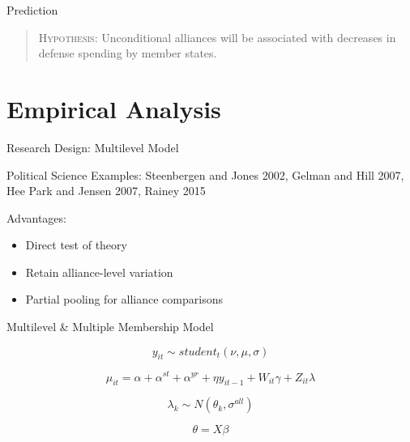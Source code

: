 \documentclass{beamer}
\begin{document}

\begin{frame}{Prediction}


\pause

\begin{quote}
\textsc{Hypothesis}: Unconditional alliances will be associated with decreases in defense spending by member states. 
\end{quote} 



\end{frame}


\section{Empirical Analysis} 


\begin{frame}{Research Design: Multilevel Model}

\pause
Political Science Examples: Steenbergen and Jones 2002, Gelman and Hill 2007, Hee Park and Jensen 2007, Rainey 2015

\pause
Advantages: 
\begin{itemize}
\item Direct test of theory
\pause
\item Retain alliance-level variation
\pause 
\item Partial pooling for alliance comparisons
\end{itemize}

\end{frame}

 
\begin{frame}{Multilevel \& Multiple Membership Model}

\begin{equation*} 
y_{it} \sim student_t(\nu, \mu, \sigma) 
\end{equation*}

\begin{equation*}
\mu_{it} = \alpha + \alpha^{st} + \alpha^{yr} + \eta y_{it-1} + W_{it} \gamma + Z_{it} \lambda
\end{equation*}

\begin{equation*}
\lambda_k \sim N(\theta_k , \sigma^{all})
\end{equation*} 

\begin{equation*}
\theta = X \beta
\end{equation*}

\end{frame}
\end{document}
